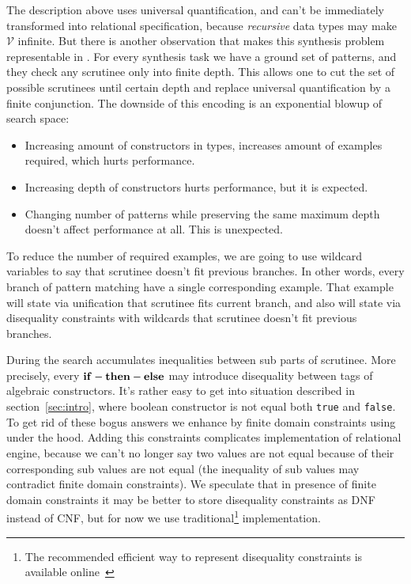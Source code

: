 \noindent The description above uses universal quantification, and can't be immediately transformed into relational specification, because \emph{recursive} data types may make $\mathcal{V}$ infinite.
But there is another observation that makes this synthesis problem representable in \miniKanren{}.
For every synthesis task we have a ground set of patterns, and they check any scrutinee only into finite depth.
This allows one to cut the set of possible scrutinees until certain depth and replace universal quantification by a finite conjunction.
The downside of this encoding is an exponential blowup of search space:
\begin{itemize}
\item Increasing amount of constructors in types, increases amount of examples required, which hurts performance.
\item Increasing depth of constructors hurts performance, but it is expected.
\item Changing number of patterns while preserving the same maximum depth doesn't affect performance at all. This is unexpected.
\end{itemize}

To reduce the number of required examples, we are going to use wildcard variables to say that scrutinee doesn't fit previous branches. In other words, every branch of pattern matching have a single corresponding example.
That example will state via unification that scrutinee fits current branch, and also will state
via disequality constraints with wildcards that scrutinee doesn't fit previous branches.

During the search \OCanren{} accumulates inequalities between sub parts of scrutinee.
More precisely, every $\mathbf{if-then-else}$ may introduce disequality between tags of algebraic constructors. It's rather easy to get into situation described in section~\ref{sec:intro}, where boolean constructor is not equal both \lstinline|true| and \lstinline|false|.
To get rid of these bogus answers we enhance \OCanren{} by finite domain constraints using \Zthree{}~\cite{Zthree} under the hood.
Adding this constraints complicates implementation of relational engine, because we can't no longer say two values are not equal because of their corresponding sub values are not equal (the inequality of sub values may contradict finite domain constraints).
We speculate that in presence of finite domain constraints it may be better to store disequality constraints as DNF instead of CNF, but for now we use traditional\footnote{The recommended efficient way to represent disequality constraints is available online~\cite{fasterMK}} implementation.

